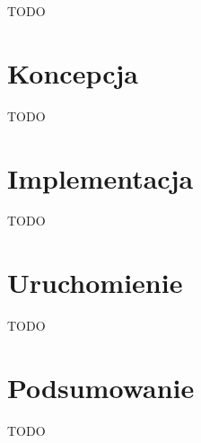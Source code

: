 \documentclass{article}
\begin{document}
TODO

\section{Koncepcja}
\label{sec:koncepcja}

TODO

\section{Implementacja}
\label{sec:implementacja}

TODO

\section{Uruchomienie}
\label{sec:uruchomienie}

TODO 
	
\section{Podsumowanie}
\label{sec:podsumowanie}

TODO


\printbibliography
	
\end{document}
